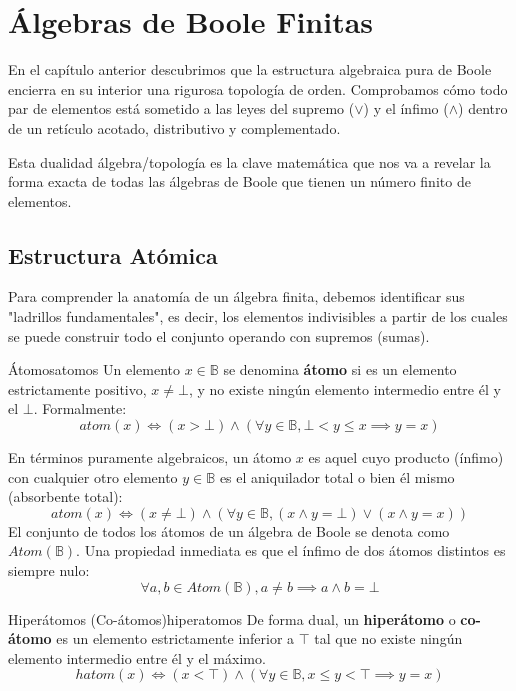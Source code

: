 \chapter{Álgebras de Boole Finitas}

En el capítulo anterior descubrimos que la estructura algebraica pura de Boole encierra en su interior una rigurosa topología de orden. Comprobamos cómo todo par de elementos está sometido a las leyes del supremo ($\vee$) y el ínfimo ($\wedge$) dentro de un retículo acotado, distributivo y complementado.

Esta dualidad álgebra/topología es la clave matemática que nos va a revelar la forma exacta de todas las álgebras de Boole que tienen un número finito de elementos.

\section{Estructura Atómica}

Para comprender la anatomía de un álgebra finita, debemos identificar sus "ladrillos fundamentales", es decir, los elementos indivisibles a partir de los cuales se puede construir todo el conjunto operando con supremos (sumas).

\begin{definicion}{Átomos}{atomos}
Un elemento $x \in \mathbb{B}$ se denomina \textbf{átomo} si es un elemento estrictamente positivo, $x \ne \bot$, y no existe ningún elemento intermedio entre él y el $\bot$. Formalmente:
\[ \mathit{atom}(x) \iff (x > \bot) \wedge \left( \forall y \in \mathbb{B}, \bot < y \le x \implies y = x \right) \]
\end{definicion}

En términos puramente algebraicos, un átomo $x$ es aquel cuyo producto (ínfimo) con cualquier otro elemento $y \in \mathbb{B}$ es el aniquilador total o bien él mismo (absorbente total):
\[ \mathit{atom}(x) \iff (x \ne \bot) \wedge \left( \forall y \in \mathbb{B}, (x \wedge y = \bot) \vee (x \wedge y = x) \right) \]
El conjunto de todos los átomos de un álgebra de Boole se denota como $\mathit{Atom}(\mathbb{B})$.
Una propiedad inmediata es que el ínfimo de dos átomos distintos es siempre nulo:
\[ \forall a, b \in \mathit{Atom}(\mathbb{B}), a \ne b \implies a \wedge b = \bot \]

\begin{definicion}{Hiperátomos (Co-átomos)}{hiperatomos}
De forma dual, un \textbf{hiperátomo} o \textbf{co-átomo} es un elemento estrictamente inferior a $\top$ tal que no existe ningún elemento intermedio entre él y el máximo.
\[ \mathit{hatom}(x) \iff (x < \top) \wedge \left( \forall y \in \mathbb{B}, x \le y < \top \implies y = x \right) \]
\end{definicion}

